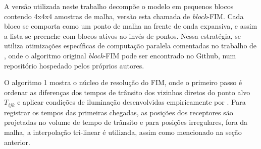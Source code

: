 A versão utilizada neste trabalho decompõe o modelo em pequenos blocos contendo 4x4x4 amostras de malha, versão esta chamada de \textit{block}-FIM. Cada bloco se comporta como um ponto de malha na frente de onda expansiva, e assim a lista se preenche com blocos ativos ao invés de pontos. Nessa estratégia, se utiliza otimizações específicas de computação paralela comentadas no trabalho de , onde o algoritmo original \textit{block}-FIM pode ser encontrado no Github, num repositório hospedado pelos próprios autores.


O algoritmo 1 mostra o núcleo de resolução do FIM, onde o primeiro passo é ordenar as diferenças dos tempos de trânsito dos vizinhos diretos do ponto alvo $T_{ijk}$ e aplicar condições de iluminação desenvolvidas empiricamente por . Para registrar os tempos das primeiras chegadas, as posições dos receptores são projetadas no volume de tempo de trânsito e para posições irregulares, fora da malha, a interpolação tri-linear é utilizada, assim como mencionado na seção anterior.  

